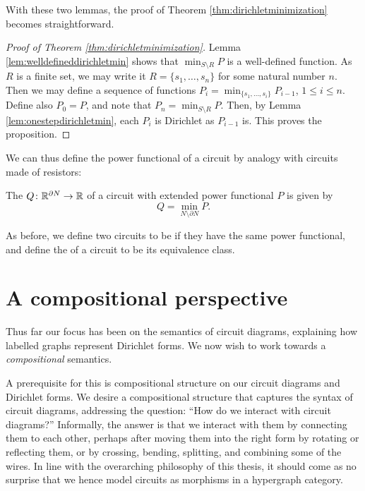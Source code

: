 With these two lemmas, the proof of Theorem \ref{thm:dirichletminimization}
becomes straightforward.

\begin{proof}[Proof of Theorem \ref{thm:dirichletminimization}]
  Lemma \ref{lem:welldefineddirichletmin} shows that $\min_{S \setminus R}P$ is a well-defined
  function. As $R$ is a finite set, we may write it $R = \{s_1,\dots, s_n\}$ for
  some natural number $n$. Then we may define a sequence of functions $P_i =
  \min_{\{s_1, \dots,s_i\}} P_{i-1}$, $1 \le i\le n$. Define also $P_0 = P$, and note
  that $P_n = \min_{S \setminus R}P$. Then, by Lemma
  \ref{lem:onestepdirichletmin}, each $P_i$ is Dirichlet as $P_{i-1}$
  is. This proves the proposition.
\end{proof}

We can thus define the power functional of a circuit by analogy with circuits made
of resistors:

\begin{definition}
The  $Q {\colon} {\mathbb{R}}^{\partial N} \to {\mathbb{R}}$ of a circuit with extended power functional $P$ is given by
\[
 Q = \min_{N \setminus \partial N}  P .
\]
\end{definition}

As before, we define two circuits to be  if they have the same
power functional, and define the  of a circuit to be its equivalence
class.  


\section{A compositional perspective} \label{sec:circdef}
Thus far our focus has been on the semantics of circuit diagrams, explaining how
labelled graphs represent Dirichlet forms. We now wish to work towards a
\emph{compositional} semantics. 

A prerequisite for this is compositional structure on our circuit diagrams and
Dirichlet forms. We desire a compositional structure that captures the syntax of
circuit diagrams, addressing the question: ``How do we interact with circuit
diagrams?'' Informally, the answer is that we interact with them by connecting them
to each other, perhaps after moving them into the right form by rotating or
reflecting them, or by crossing, bending, splitting, and combining some of the
wires. In line with the overarching philosophy of this thesis, it should come as
no surprise that we hence model circuits as morphisms in a hypergraph category. 

